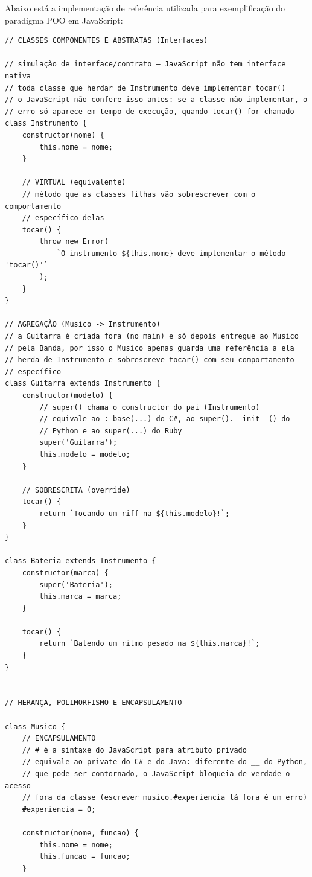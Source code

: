 Abaixo está a implementação de referência utilizada para exemplificação do paradigma POO em
JavaScript:

\begin{lstlisting}[style=javascript, caption={Exemplo de Aplicação de POO em JavaScript}]
// CLASSES COMPONENTES E ABSTRATAS (Interfaces)

// simulação de interface/contrato — JavaScript não tem interface nativa
// toda classe que herdar de Instrumento deve implementar tocar()
// o JavaScript não confere isso antes: se a classe não implementar, o
// erro só aparece em tempo de execução, quando tocar() for chamado
class Instrumento {
    constructor(nome) {
        this.nome = nome;
    }

    // VIRTUAL (equivalente)
    // método que as classes filhas vão sobrescrever com o comportamento
    // específico delas
    tocar() {
        throw new Error(
            `O instrumento ${this.nome} deve implementar o método 'tocar()'`
        );
    }
}

// AGREGAÇÃO (Musico -> Instrumento)
// a Guitarra é criada fora (no main) e só depois entregue ao Musico
// pela Banda, por isso o Musico apenas guarda uma referência a ela
// herda de Instrumento e sobrescreve tocar() com seu comportamento
// específico
class Guitarra extends Instrumento {
    constructor(modelo) {
        // super() chama o constructor do pai (Instrumento)
        // equivale ao : base(...) do C#, ao super().__init__() do
        // Python e ao super(...) do Ruby
        super('Guitarra');
        this.modelo = modelo;
    }

    // SOBRESCRITA (override)
    tocar() {
        return `Tocando um riff na ${this.modelo}!`;
    }
}

class Bateria extends Instrumento {
    constructor(marca) {
        super('Bateria');
        this.marca = marca;
    }

    tocar() {
        return `Batendo um ritmo pesado na ${this.marca}!`;
    }
}


// HERANÇA, POLIMORFISMO E ENCAPSULAMENTO

class Musico {
    // ENCAPSULAMENTO
    // # é a sintaxe do JavaScript para atributo privado
    // equivale ao private do C# e do Java: diferente do __ do Python,
    // que pode ser contornado, o JavaScript bloqueia de verdade o acesso
    // fora da classe (escrever musico.#experiencia lá fora é um erro)
    #experiencia = 0;

    constructor(nome, funcao) {
        this.nome = nome;
        this.funcao = funcao;
    }


\end{lstlisting}
